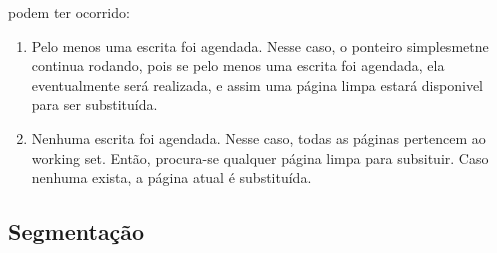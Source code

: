 \documentclass[10pt]{article}
\begin{document}
\begin{itemize}
        podem ter ocorrido:
    \begin{enumerate}
        \item Pelo menos uma escrita foi agendada. Nesse caso, o ponteiro simplesmetne continua
            rodando, pois se pelo menos uma escrita foi agendada, ela eventualmente será 
            realizada, e assim uma página limpa estará disponivel para ser substituída.
        \item Nenhuma escrita foi agendada. Nesse caso, todas as páginas pertencem ao working
            set. Então, procura-se qualquer página limpa para subsituir. Caso nenhuma exista,
            a página atual é substituída.
    \end{enumerate}
\end{itemize}

\subsection{Segmentação}
\end{document}
